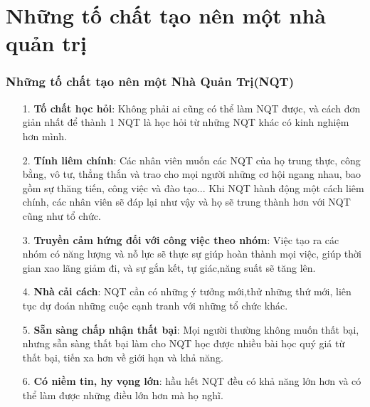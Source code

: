 \documentclass[10pt]{beamer}
\begin{document}
\section{Những tố chất tạo nên một nhà quản trị}
\begin{frame}
\transblindshorizontal
\frametitle{Những tố chất tạo nên một Nhà Quản Trị(NQT)}
\pause
\begin{itemize}
\item[1.]\textbf{Tố chất học hỏi}: Không phải ai cũng có thể làm NQT được, và cách đơn giản nhất để thành 1 NQT là học hỏi từ những NQT khác có kinh nghiệm hơn mình.
\pause
\item[2.]\textbf{Tính liêm chính}: Các nhân viên muốn các NQT của họ trung thực, công bằng, vô tư, thẳng thắn và trao cho mọi người những cơ hội ngang nhau, bao gồm sự thăng tiến, công việc và đào tạo... Khi NQT hành động một cách liêm chính, các nhân viên sẽ đáp lại như vậy và họ sẽ trung thành hơn với NQT cũng như tổ chức.
\pause
\item[3.]\textbf{Truyền cảm hứng đối với công việc theo nhóm}: Việc tạo ra các nhóm có năng lượng và nỗ lực sẽ thực sự giúp hoàn thành mọi việc, giúp  thời gian xao lãng  giảm đi, và sự gắn kết, tự giác,năng suất sẽ tăng lên.
\pause
\item[4.]\textbf{Nhà cải cách}: NQT cần có những ý tưởng mới,thử những thứ mới, liên tục dự đoán những cuộc cạnh tranh với những tổ chức khác.
\pause
\item[5.]\textbf{Sẵn sàng chấp nhận thất bại}: Mọi người thường không muốn thất bại, nhưng sẵn sàng thất bại làm cho NQT học được nhiều bài học quý giá từ thất bại, tiến xa hơn về giới hạn và khả năng.
\pause
\item[6.]\textbf{Có niềm tin, hy vọng lớn}: hầu hết NQT đều có khả năng lớn hơn và có thể làm được những điều lớn hơn mà họ nghĩ.
\end{itemize}
\end{frame}
    
\end{document}
